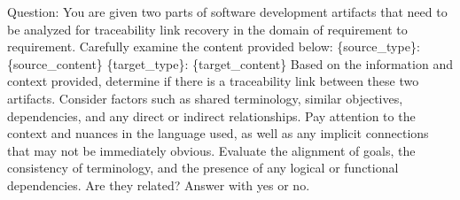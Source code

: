 Question: You are given two parts of software development artifacts that need to be analyzed for traceability link recovery in the domain of requirement to requirement. Carefully examine the content provided below:\newline
\newline
\{source\_type\}: \textquotesingle{}\textquotesingle{}\textquotesingle{}\{source\_content\}\textquotesingle{}\textquotesingle{}\textquotesingle{}\newline
\newline
\{target\_type\}: \textquotesingle{}\textquotesingle{}\textquotesingle{}\{target\_content\}\textquotesingle{}\textquotesingle{}\textquotesingle{}\newline
\newline
Based on the information and context provided, determine if there is a traceability link between these two artifacts. Consider factors such as shared terminology, similar objectives, dependencies, and any direct or indirect relationships. Pay attention to the context and nuances in the language used, as well as any implicit connections that may not be immediately obvious. Evaluate the alignment of goals, the consistency of terminology, and the presence of any logical or functional dependencies. Are they related?\newline
\newline
Answer with \textquotesingle{}yes\textquotesingle{} or \textquotesingle{}no\textquotesingle{}.